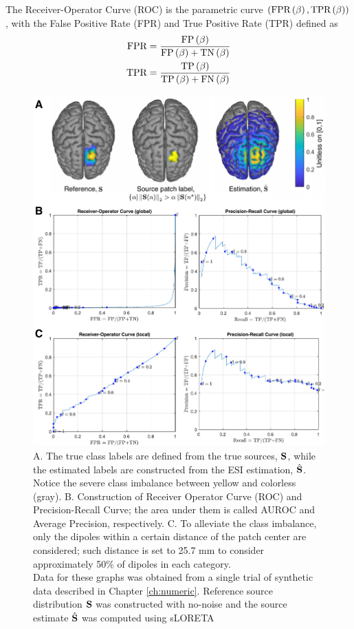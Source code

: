 The Receiver-Operator Curve (ROC) is the parametric curve 
$\left( \text{FPR}\left( \beta \right), \text{TPR}\left( \beta \right) \right)$, with the False Positive Rate (FPR) and True Positive Rate (TPR) defined as
\begin{align}
\text{FPR}
&=
\frac{ \text{FP}\left( \beta \right) }{\text{FP}\left( \beta \right) + \text{TN}\left( \beta \right)}
\\
\text{TPR}
&=
\frac{ \text{TP}\left( \beta \right) }{\text{TP}\left( \beta \right) + \text{FN}\left( \beta \right)}
\end{align}

\begin{figure}
\centering
\includegraphics[scale=0.85]{./img/AUROC_sketch.pdf}
%
\caption{
A. The true class labels are defined from the true sources, $\mathbf{S}$, while the estimated labels are constructed from the ESI estimation, $\hat{\mathbf{S}}$.
Notice the severe class imbalance between yellow and colorless (gray).
%
B. Construction of Receiver Operator Curve (ROC) and Precision-Recall Curve; the area under them is called AUROC and Average Precision, respectively.
%
C. To alleviate the class imbalance, only the dipoles within a certain distance of the patch center are considered; such distance is set to 25.7 \si{mm} to consider approximately 50\% of dipoles in each category.
\\
%
Data for these graphs was obtained from a single trial of synthetic data described in Chapter \ref{ch:numeric}. Reference source distribution $\mathbf{S}$ was constructed with no-noise and the source estimate $\hat{\mathbf{S}}$ was computed using sLORETA
}
\end{figure}


